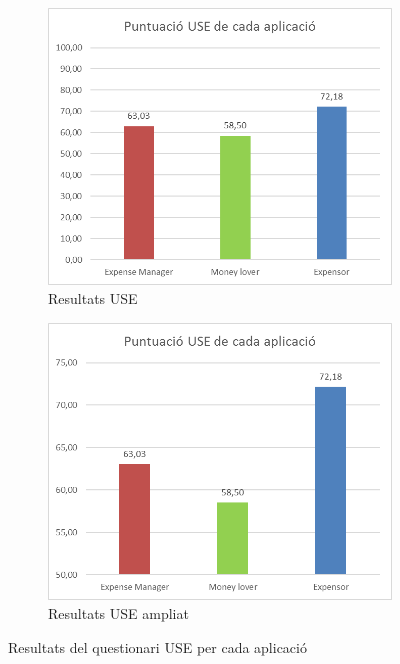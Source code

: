 \begin{figure}
	\centering
	
	\begin{subfigure}[b]{0.45\textwidth}
		\centering
		\includegraphics[scale=0.6]{USE_1.png}
		\caption{Resultats USE}
		\label{fig:USE_1}
	\end{subfigure}
	\quad
	\begin{subfigure}[b]{0.45\textwidth}
		\centering
		\includegraphics[scale=0.6]{USE_2.png}
		\caption{Resultats USE ampliat}
		\label{fig:USE_2}
	\end{subfigure}

\caption{Resultats del questionari USE per cada aplicació}\label{fig:USE_result}
\end{figure}


